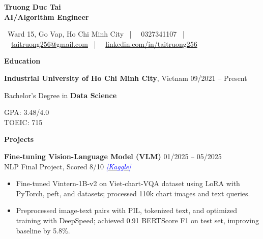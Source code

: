 \documentclass[10pt]{article}
\begin{document}
\begin{center}
    {\large \textbf{Truong Duc Tai}} \\
    \textbf{AI/Algorithm Engineer}
\end{center}

\begin{center}
    \footnotesize
    \faMapMarker \ Ward 15, Go Vap, Ho Chi Minh City \ | \ 
    \faPhone \ 0327341107 \ | \ 
    \faEnvelope \ \href{mailto:taitruong256@gmail.com}{taitruong256@gmail.com} \ | \ 
    \faLinkedin \ \href{https://www.linkedin.com/in/taitruong256}{linkedin.com/in/taitruong256}
\end{center}

\begin{center}
    \vspace{0.05cm}
    \hrulefill
    \vspace{0.05cm}
\end{center}

\begin{center}
    \textbf{Education}
\end{center}

\textbf{Industrial University of Ho Chi Minh City}, Vietnam \hfill 09/2021 -- Present \\
\begin{minipage}[t]{0.65\textwidth}
    Bachelor’s Degree in \textbf{Data Science}
\end{minipage}%
\begin{minipage}[t]{0.35\textwidth}
    \raggedleft
    GPA: 3.48/4.0 \\
    TOEIC: 715
\end{minipage}

\begin{center}
    \vspace{0.05cm}
    \hrulefill
    \vspace{0.05cm}
\end{center}

\begin{center}
    \textbf{Projects}
\end{center}

\textbf{Fine-tuning Vision-Language Model (VLM)} \hfill 01/2025 -- 05/2025 \\
NLP Final Project, Scored 8/10 \hfill \href{https://www.kaggle.com/code/taitruong256/fine-tuned-vintern-1b-v2-chart-vqa}{\textcolor{blue}{\textit{[Kaggle]}}}

\begin{itemize}[noitemsep, topsep=0pt, partopsep=0pt, parsep=0pt]
    \item Fine-tuned Vintern-1B-v2 on Viet-chart-VQA dataset using LoRA with PyTorch, peft, and datasets; processed 110k chart images and text queries.
    \item Preprocessed image-text pairs with PIL, tokenized text, and optimized training with DeepSpeed; achieved 0.91 BERTScore F1 on test set, improving baseline by 5.8\%.
\end{itemize}
\end{document}
